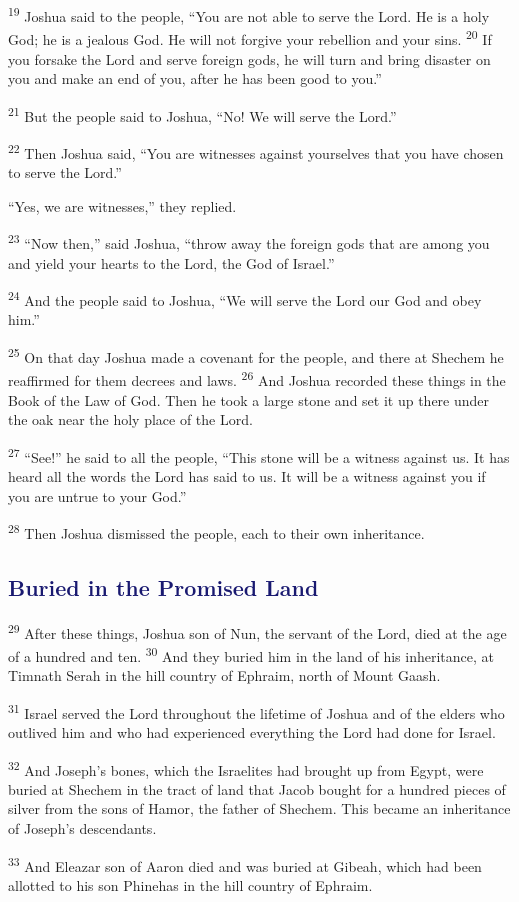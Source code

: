 \documentclass[12pt,twoside]{article}
\newcommand{\vs}[1]{\textsuperscript{#1}}
\begin{document}
\vs{19} Joshua said to the people, ``You are not able to serve the Lord. He is a holy God; he is a jealous God. He will not forgive your rebellion and your sins.
\vs{20} If you forsake the Lord and serve foreign gods, he will turn and bring disaster on you and make an end of you, after he has been good to you.''

\vs{21} But the people said to Joshua, ``No! We will serve the Lord.''

\vs{22} Then Joshua said, ``You are witnesses against yourselves that you have chosen to serve the Lord.''

``Yes, we are witnesses,'' they replied.

\vs{23} ``Now then,'' said Joshua, ``throw away the foreign gods that are among you and yield your hearts to the Lord, the God of Israel.''

\vs{24} And the people said to Joshua, ``We will serve the Lord our God and obey him.''

\vs{25} On that day Joshua made a covenant for the people, and there at Shechem he reaffirmed for them decrees and laws.
\vs{26} And Joshua recorded these things in the Book of the Law of God. Then he took a large stone and set it up there under the oak near the holy place of the Lord.

\vs{27} ``See!'' he said to all the people, ``This stone will be a witness against us. It has heard all the words the Lord has said to us. It will be a witness against you if you are untrue to your God.''

\vs{28} Then Joshua dismissed the people, each to their own inheritance.

\subsection*{{\textcolor{MidnightBlue}{\textbf{Buried in the Promised Land}}}}

\hspace{0.5cm} \vs{29} After these things, Joshua son of Nun, the servant of the Lord, died at the age of a hundred and ten.
\vs{30} And they buried him in the land of his inheritance, at Timnath Serah in the hill country of Ephraim, north of Mount Gaash.

\vs{31} Israel served the Lord throughout the lifetime of Joshua and of the elders who outlived him and who had experienced everything the Lord had done for Israel.

\vs{32} And Joseph's bones, which the Israelites had brought up from Egypt, were buried at Shechem in the tract of land that Jacob bought for a hundred pieces of silver from the sons of Hamor, the father of Shechem. This became an inheritance of Joseph's descendants.

\vs{33} And Eleazar son of Aaron died and was buried at Gibeah, which had been allotted to his son Phinehas in the hill country of Ephraim.







 
\end{document}
